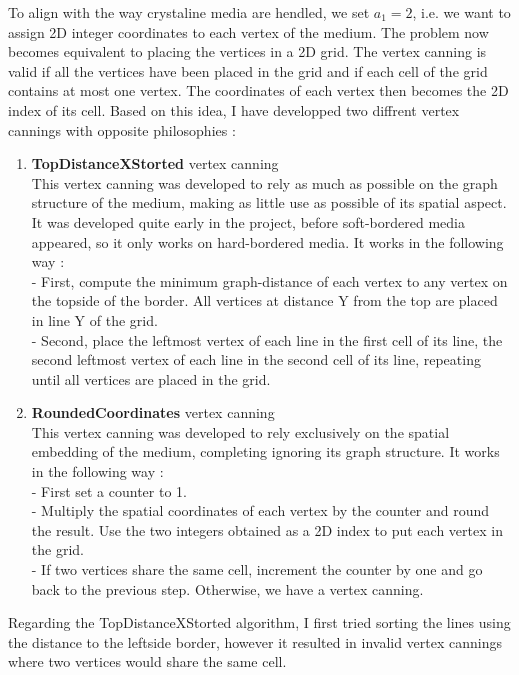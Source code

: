 \documentclass{article}
\begin{document}
To align with the way crystaline media are hendled, we set $a_1 = 2$, i.e. we want to assign 2D integer coordinates to each vertex of the medium. The problem now becomes equivalent to placing the vertices in a 2D grid. The vertex canning is valid if all the vertices have been placed in the grid and if each cell of the grid contains at most one vertex. The coordinates of each vertex then becomes the 2D index of its cell. Based on this idea, I have developped two diffrent vertex cannings with opposite philosophies :
\begin{enumerate}
	\item \textbf{TopDistanceXStorted} vertex canning\\
	This vertex canning was developed to rely as much as possible on the graph structure of the medium, making as little use as possible of its spatial aspect. It was developed quite early in the project, before soft-bordered media appeared, so it only works on hard-bordered media. It works in the following way :\\
	- First, compute the minimum graph-distance of each vertex to any vertex on the topside of the border. All vertices at distance Y from the top are placed in line Y of the grid.\\
	- Second, place the leftmost vertex of each line in the first cell of its line, the second leftmost vertex of each line in the second cell of its line, repeating until all vertices are placed in the grid.
	
	\item \textbf{RoundedCoordinates} vertex canning\\
	This vertex canning was developed to rely exclusively on the spatial embedding of the medium, completing ignoring its graph structure. It works in the following way :\\
	- First set a counter to 1.\\
	- Multiply the spatial coordinates of each vertex by the counter and round the result. Use the two integers obtained as a 2D index to put each vertex in the grid.\\
	- If two vertices share the same cell, increment the counter by one and go back to the previous step. Otherwise, we have a vertex canning.
\end{enumerate}

Regarding the TopDistanceXStorted algorithm, I first tried sorting the lines using the distance to the leftside border, however it resulted in invalid vertex cannings where two vertices would share the same cell.
\end{document}
